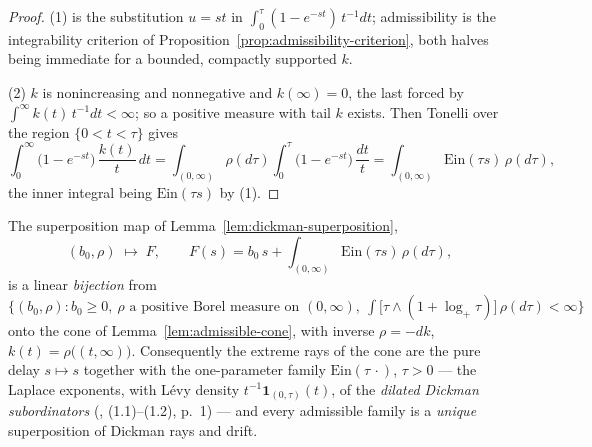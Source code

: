 \begin{proof}
(1) is the substitution $u = st$ in $\int_0^\tau (1 - e^{-st})\,t^{-1}dt$; admissibility is the
integrability criterion of Proposition~\ref{prop:admissibility-criterion}, both halves being
immediate for a bounded, compactly supported $k$.

(2) $k$ is nonincreasing and nonnegative and $k(\infty) = 0$, the last forced by
$\int^\infty k(t)\,t^{-1}dt < \infty$; so a positive measure with tail $k$ exists. Then Tonelli
over the region $\{0 < t < \tau\}$ gives
\[
  \int_0^\infty \bigl(1 - e^{-st}\bigr)\,\frac{k(t)}{t}\,dt
  = \int_{(0,\infty)} \rho(d\tau) \int_0^\tau \bigl(1 - e^{-st}\bigr)\,\frac{dt}{t}
  = \int_{(0,\infty)} \mathrm{Ein}(\tau s)\,\rho(d\tau),
\]
the inner integral being $\mathrm{Ein}(\tau s)$ by (1).
\end{proof}

\begin{proposition}\label{prop:extreme-rays}
The superposition map of Lemma~\ref{lem:dickman-superposition},
\[
  (b_0, \rho) \;\mapsto\; F, \qquad
  F(s) = b_0\,s + \int_{(0,\infty)} \mathrm{Ein}(\tau s)\,\rho(d\tau),
\]
is a linear \emph{bijection} from
$\bigl\{(b_0, \rho) : b_0 \ge 0,\ \rho \text{ a positive Borel measure on } (0,\infty),\
\int \bigl[\tau \wedge (1 + \log_+ \tau)\bigr]\,\rho(d\tau) < \infty \bigr\}$
onto the cone of Lemma~\ref{lem:admissible-cone}, with inverse $\rho = -dk$,
$k(t) = \rho\bigl((t,\infty)\bigr)$. Consequently the
extreme rays of the cone are the pure delay $s \mapsto s$ together with the one-parameter family
$\mathrm{Ein}(\tau\,\cdot)$, $\tau > 0$ --- the Laplace exponents, with L\'evy density
$t^{-1}\mathbf{1}_{(0,\tau)}(t)$, of the \emph{dilated Dickman subordinators}
(\sscite{caravenna2019dickman}, (1.1)--(1.2), p.~1) --- and every admissible family is a
\emph{unique} superposition of Dickman rays and drift.
\end{proposition}

